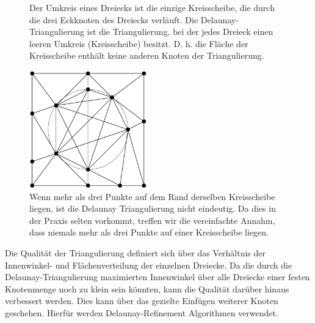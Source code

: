 \begin{figure}[H]%
    \centering
  
  \caption{Der Umkreis eines Dreiecks ist die einzige Kreisscheibe, die durch die drei Eckknoten des Dreiecks verläuft. Die Delaunay-Triangulierung ist die Triangulierung, bei der jedes Dreieck einen leeren Umkreis (Kreisscheibe) besitzt. D. h. die Fläche der Kreisscheibe enthält keine anderen Knoten der Triangulierung. \cite{Gjacquenot:2013:delaunay-circumcircles}}
  \label{fig:delaunay_umkreis}
\end{figure}
    
    
\begin{figure}[H]
    \centering
    \includegraphics[width=2in]{images/Bildschirmfoto von 2021-11-27 22-34-40.png}
    \caption{ Wenn mehr als drei Punkte auf dem Rand derselben Kreisscheibe liegen, ist die Delaunay Triangulierung nicht eindeutig. Da dies in der  Praxis selten vorkommt, treffen wir die vereinfachte Annahm, dass niemals mehr als drei Punkte auf einer Kreisscheibe liegen.~\cite{shewchuk:1997:delaunay} }
    \label{fig:eindeutig}
\end{figure}
    
\newpage

Die Qualität der Triangulierung definiert sich über das Verhältnis der  Innenwinkel- und Flächenverteilung der einzelnen Dreiecke. 
Da die durch die Delaunay-Triangulierung maximierten Innenwinkel über alle Dreiecke einer festen Knotenmenge noch zu klein sein könnten, 
kann die Qualität darüber hinaus verbessert werden. Dies kann über das gezielte Einfügen weiterer Knoten geschehen. Hierfür werden Delaunay-Refinement Algorithmen verwendet.\\

 





